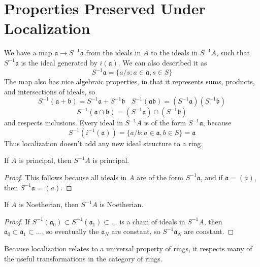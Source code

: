 \section{Properties Preserved Under Localization}

We have a map $\mathfrak{a} \to S^{-1}\mathfrak{a}$ from the ideals in $A$ to the ideals in $S^{-1}A$, such that $S^{-1}\mathfrak{a}$ is the ideal generated by $i(\mathfrak{a})$. We can also described it as
%
\[ S^{-1}\mathfrak{a} = \{ a/s : a \in \mathfrak{a}, s \in S \} \]
%
The map also has nice algebraic properties, in that it represents sums, products, and intersections of ideals, so
%
\[ S^{-1}(\mathfrak{a} + \mathfrak{b}) = S^{-1}\mathfrak{a} + S^{-1}\mathfrak{b}\ \ \ \ S^{-1}(\mathfrak{a} \mathfrak{b}) = (S^{-1} \mathfrak{a})(S^{-1}\mathfrak{b}) \]
\[ S^{-1}(\mathfrak{a} \cap \mathfrak{b}) = (S^{-1} \mathfrak{a}) \cap (S^{-1} \mathfrak{b}) \]
%
and respects inclusions. Every ideal in $S^{-1}A$ is of the form $S^{-1}\mathfrak{a}$, because
%
\[ S^{-1}(i^{-1}(\mathfrak{a})) = \{ a/b : a \in \mathfrak{a}, b \in S \} = \mathfrak{a} \]
%
Thus localization doesn't add any new ideal structure to a ring.

\begin{prop}
    If $A$ is principal, then $S^{-1}A$ is principal.
\end{prop}
\begin{proof}
    This follows because all ideals in $A$ are of the form $S^{-1} \mathfrak{a}$, and if $\mathfrak{a} = (a)$, then $S^{-1}\mathfrak{a} = (a)$.
\end{proof}

\begin{prop}
    If $A$ is Noetherian, then $S^{-1}A$ is Noetherian.
\end{prop}
\begin{proof}
    If $S^{-1}(\mathfrak{a}_0) \subset S^{-1}(\mathfrak{a}_1) \subset \dots$ is a chain of ideals in $S^{-1}A$, then $\mathfrak{a}_0 \subset \mathfrak{a}_1 \subset \dots$, so eventually the $\mathfrak{a}_N$ are constant, so $S^{-1}\mathfrak{a}_N$ are constant.
\end{proof}

Because localization relates to a universal property of rings, it respects many of the useful transformations in the category of rings.

